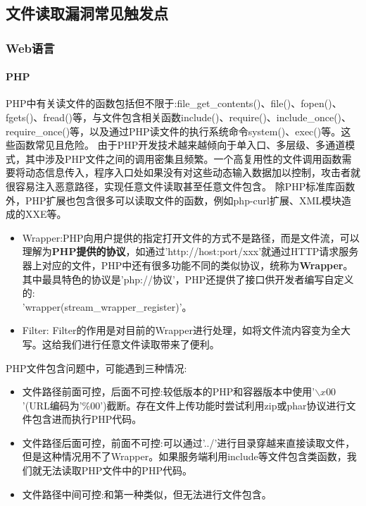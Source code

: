 \subsection{文件读取漏洞常见触发点}
\subsubsection*{Web语言}
\paragraph*{PHP}
PHP中有关读文件的函数包括但不限于:file\_get\_contents()、file()、fopen()、fgets()、fread()等，与文件包含相关函数include()、require()、include\_once()、require\_once()等，以及通过PHP读文件的执行系统命令system()、exec()等。这些函数常见且危险。
由于PHP开发技术越来越倾向于单入口、多层级、多通道模式，其中涉及PHP文件之间的调用密集且频繁。一个高复用性的文件调用函数需要将动态信息传入，程序入口处如果没有对这些动态输入数据加以控制，攻击者就很容易注入恶意路径，实现任意文件读取甚至任意文件包含。
除PHP标准库函数外，PHP扩展也包含很多可以读取文件的函数，例如php-curl扩展、XML模块造成的XXE等。
\begin{itemize}
    \item Wrapper:PHP向用户提供的指定打开文件的方式不是路径，而是文件流，可以理解为\textbf{PHP提供的协议}，如通过'http://host:port/xxx'就通过HTTP请求服务器上对应的文件，PHP中还有很多功能不同的类似协议，统称为\textbf{Wrapper}。其中最具特色的协议是'php://协议'，PHP还提供了接口供开发者编写自定义的:\\'wrapper(stream\_wrapper\_register)'。
    \item Filter: Filter的作用是对目前的Wrapper进行处理，如将文件流内容变为全大写。这给我们进行任意文件读取带来了便利。
\end{itemize}
PHP文件包含问题中，可能遇到三种情况:
\begin{itemize}
    \item 文件路径前面可控，后面不可控:较低版本的PHP和容器版本中使用'$\backslash x00$'(URL编码为'\%00')截断。存在文件上传功能时尝试利用zip或phar协议进行文件包含进而执行PHP代码。
    \item 文件路径后面可控，前面不可控:可以通过'../'进行目录穿越来直接读取文件，但是这种情况用不了Wrapper。如果服务端利用include等文件包含类函数，我们就无法读取PHP文件中的PHP代码。
    \item 文件路径中间可控:和第一种类似，但无法进行文件包含。
\end{itemize}

